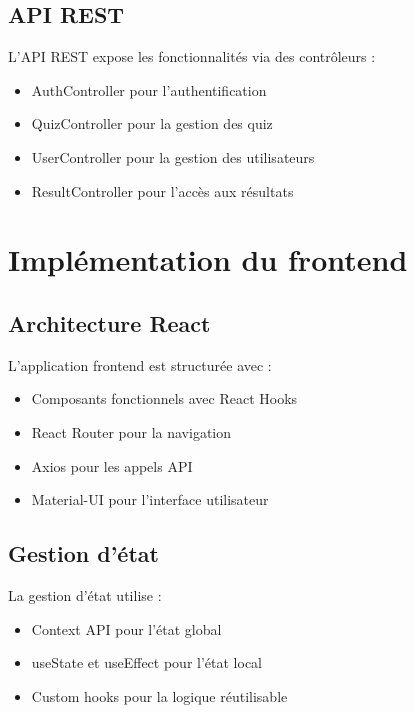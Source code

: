 \documentclass[12pt,a4paper]{report}
\begin{document}
\subsection{API REST}

L'API REST expose les fonctionnalités via des contrôleurs :

\begin{itemize}
    \item AuthController pour l'authentification
    \item QuizController pour la gestion des quiz
    \item UserController pour la gestion des utilisateurs
    \item ResultController pour l'accès aux résultats
\end{itemize}

\section{Implémentation du frontend}

\subsection{Architecture React}

L'application frontend est structurée avec :

\begin{itemize}
    \item Composants fonctionnels avec React Hooks
    \item React Router pour la navigation
    \item Axios pour les appels API
    \item Material-UI pour l'interface utilisateur
\end{itemize}

\subsection{Gestion d'état}

La gestion d'état utilise :

\begin{itemize}
    \item Context API pour l'état global
    \item useState et useEffect pour l'état local
    \item Custom hooks pour la logique réutilisable
\end{itemize}
\end{document}
